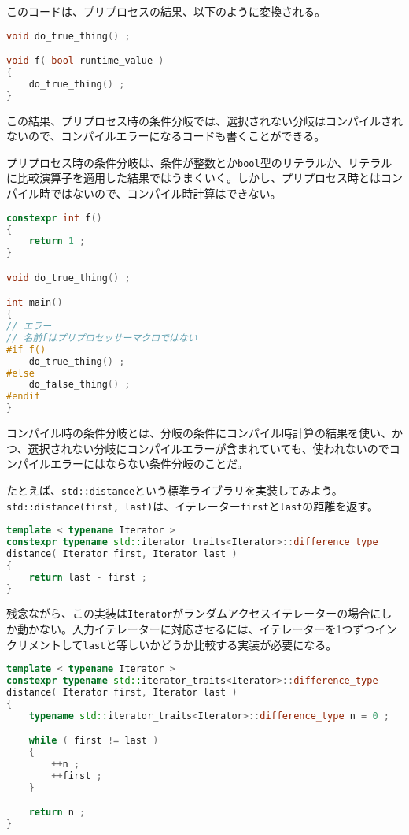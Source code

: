 このコードは、プリプロセスの結果、以下のように変換される。

\begin{lstlisting}[language=C++]
void do_true_thing() ;

void f( bool runtime_value )
{
    do_true_thing() ;
}
\end{lstlisting}

この結果、プリプロセス時の条件分岐では、選択されない分岐はコンパイルされないので、コンパイルエラーになるコードも書くことができる。

プリプロセス時の条件分岐は、条件が整数とか\lstinline!bool!型のリテラルか、リテラルに比較演算子を適用した結果ではうまくいく。しかし、プリプロセス時とはコンパイル時ではないので、コンパイル時計算はできない。

\begin{lstlisting}[language=C++]
constexpr int f()
{
    return 1 ;
}

void do_true_thing() ;

int main()
{
// エラー
// 名前fはプリプロセッサーマクロではない
#if f()
    do_true_thing() ;
#else
    do_false_thing() ;
#endif
}
\end{lstlisting}

%

コンパイル時の条件分岐とは、分岐の条件にコンパイル時計算の結果を使い、かつ、選択されない分岐にコンパイルエラーが含まれていても、使われないのでコンパイルエラーにはならない条件分岐のことだ。

たとえば、\lstinline!std::distance!という標準ライブラリを実装してみよう。\lstinline!std::distance(first, last)!は、イテレーター\lstinline!first!と\lstinline!last!の距離を返す。

\begin{lstlisting}[language=C++]
template < typename Iterator >
constexpr typename std::iterator_traits<Iterator>::difference_type
distance( Iterator first, Iterator last )
{
    return last - first ;
}
\end{lstlisting}

残念ながら、この実装は\lstinline!Iterator!がランダムアクセスイテレーターの場合にしか動かない。入力イテレーターに対応させるには、イテレーターを1つずつインクリメントして\lstinline!last!と等しいかどうか比較する実装が必要になる。

\begin{lstlisting}[language=C++]
template < typename Iterator >
constexpr typename std::iterator_traits<Iterator>::difference_type
distance( Iterator first, Iterator last )
{
    typename std::iterator_traits<Iterator>::difference_type n = 0 ;

    while ( first != last )
    {
        ++n ;
        ++first ;
    }

    return n ;
}
\end{lstlisting}

